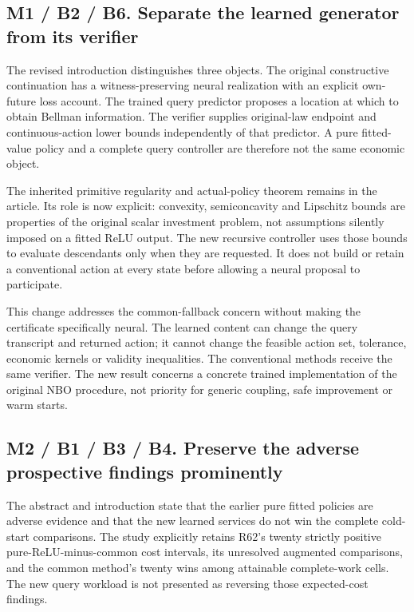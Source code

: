\documentclass[ecta,nameyear,draft]{econsocart}
\begin{document}
\hypertarget{m1-b2-b6.-separate-the-learned-generator-from-its-verifier}{%
\subsection{M1 / B2 / B6. Separate the learned generator from its
verifier}\label{m1-b2-b6.-separate-the-learned-generator-from-its-verifier}}

The revised introduction distinguishes three objects. The original
constructive continuation has a witness-preserving neural realization
with an explicit own-future loss account. The trained query predictor
proposes a location at which to obtain Bellman information. The verifier
supplies original-law endpoint and continuous-action lower bounds
independently of that predictor. A pure fitted-value policy and a
complete query controller are therefore not the same economic object.

The inherited primitive regularity and actual-policy theorem remains in
the article. Its role is now explicit: convexity, semiconcavity and
Lipschitz bounds are properties of the original scalar investment
problem, not assumptions silently imposed on a fitted ReLU output. The
new recursive controller uses those bounds to evaluate descendants only
when they are requested. It does not build or retain a conventional
action at every state before allowing a neural proposal to participate.

This change addresses the common-fallback concern without making the
certificate specifically neural. The learned content can change the
query transcript and returned action; it cannot change the feasible
action set, tolerance, economic kernels or validity inequalities. The
conventional methods receive the same verifier. The new result concerns
a concrete trained implementation of the original NBO procedure, not
priority for generic coupling, safe improvement or warm starts.

\hypertarget{m2-b1-b3-b4.-preserve-the-adverse-prospective-findings-prominently}{%
\subsection{M2 / B1 / B3 / B4. Preserve the adverse prospective findings
prominently}\label{m2-b1-b3-b4.-preserve-the-adverse-prospective-findings-prominently}}

The abstract and introduction state that the earlier pure fitted
policies are adverse evidence and that the new learned services do not
win the complete cold-start comparisons. The study explicitly retains
R62's twenty strictly positive pure-ReLU-minus-common cost intervals,
its unresolved augmented comparisons, and the common method's twenty
wins among attainable complete-work cells. The new query workload is not
presented as reversing those expected-cost findings.
\end{document}
